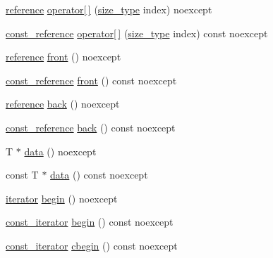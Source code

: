 \begin{DoxyCompactItemize}
\item 
\mbox{\hyperlink{classmage_1_1_memory_buffer_ad28560f5391baac5dade220c99d9d62b}{reference}} \mbox{\hyperlink{classmage_1_1_memory_buffer_a71dc88ccb1b189a772ef4c5d095b883e}{operator\mbox{[}$\,$\mbox{]}}} (\mbox{\hyperlink{classmage_1_1_memory_buffer_a77b459da2e6f1c57c21467a6eff8e9f9}{size\+\_\+type}} index) noexcept
\item 
\mbox{\hyperlink{classmage_1_1_memory_buffer_aa54883bc0cb483fef570663344f85bb7}{const\+\_\+reference}} \mbox{\hyperlink{classmage_1_1_memory_buffer_aabd7699f6861881f636a1083e1d161f8}{operator\mbox{[}$\,$\mbox{]}}} (\mbox{\hyperlink{classmage_1_1_memory_buffer_a77b459da2e6f1c57c21467a6eff8e9f9}{size\+\_\+type}} index) const noexcept
\item 
\mbox{\hyperlink{classmage_1_1_memory_buffer_ad28560f5391baac5dade220c99d9d62b}{reference}} \mbox{\hyperlink{classmage_1_1_memory_buffer_a19e923d528e753b5834092b4d8961754}{front}} () noexcept
\item 
\mbox{\hyperlink{classmage_1_1_memory_buffer_aa54883bc0cb483fef570663344f85bb7}{const\+\_\+reference}} \mbox{\hyperlink{classmage_1_1_memory_buffer_ac09b5ff4c9bf387fa1f28c0a66aaaa0a}{front}} () const noexcept
\item 
\mbox{\hyperlink{classmage_1_1_memory_buffer_ad28560f5391baac5dade220c99d9d62b}{reference}} \mbox{\hyperlink{classmage_1_1_memory_buffer_a7dcdb6998c7faa24a00026d3de795bc9}{back}} () noexcept
\item 
\mbox{\hyperlink{classmage_1_1_memory_buffer_aa54883bc0cb483fef570663344f85bb7}{const\+\_\+reference}} \mbox{\hyperlink{classmage_1_1_memory_buffer_ad3e88cdcf2b50096424cf4186f6d8b87}{back}} () const noexcept
\item 
T $\ast$ \mbox{\hyperlink{classmage_1_1_memory_buffer_a5b4ff0013b0ee1b657d7f7147379fa69}{data}} () noexcept
\item 
const T $\ast$ \mbox{\hyperlink{classmage_1_1_memory_buffer_a3ed335a3d83767be414b403f3d2aaf97}{data}} () const noexcept
\item 
\mbox{\hyperlink{classmage_1_1_memory_buffer_af487a5f5f07f8ba65e3a5d3a26d32b6c}{iterator}} \mbox{\hyperlink{classmage_1_1_memory_buffer_a499abd90d19aebe0441a21fbafe499e5}{begin}} () noexcept
\item 
\mbox{\hyperlink{classmage_1_1_memory_buffer_a3cc14c15660c36d35195e1836db33ee7}{const\+\_\+iterator}} \mbox{\hyperlink{classmage_1_1_memory_buffer_a47f825ee6c86a8afb40d4b632a051bb0}{begin}} () const noexcept
\item 
\mbox{\hyperlink{classmage_1_1_memory_buffer_a3cc14c15660c36d35195e1836db33ee7}{const\+\_\+iterator}} \mbox{\hyperlink{classmage_1_1_memory_buffer_a87ffbff84c954542613a561308502527}{cbegin}} () const noexcept

\end{DoxyCompactItemize}
